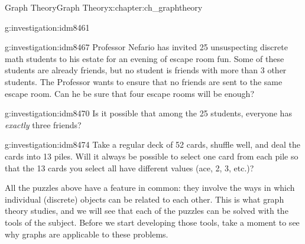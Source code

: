 \documentclass[oneside,10pt,]{book}
\numberwithin{equation}{chapter}
\begin{document}
\begin{chapterptx}{Graph Theory}{}{Graph Theory}{}{}{x:chapter:ch_graphtheory}
\begin{introduction}{}
\begin{investigation}{}{g:investigation:idm8461}
\begin{sidebyside}{1}{0}{0}{0}
\begin{sbspanel}{1}
{
}%
\end{sbspanel}%
\end{sidebyside}%
\end{investigation}
\begin{investigation}{}{g:investigation:idm8467}%
Professor Nefario has invited 25 unsuspecting discrete math students to his estate for an evening of escape room fun.  Some of these students are already friends, but no student is friends with more than 3 other students.  The Professor wants to ensure that no friends are sent to the same escape room.  Can he be sure that four escape rooms will be enough?%
\end{investigation}
\begin{investigation}{}{g:investigation:idm8470}%
Is it possible that among the 25 students, everyone has \emph{exactly} three friends?%
\end{investigation}
\begin{investigation}{}{g:investigation:idm8474}%
Take a regular deck of 52 cards, shuffle well, and deal the cards into 13 piles.  Will it always be possible to select one card from each pile so that the 13 cards you select all have different values (ace, 2, 3, etc.)?%
\end{investigation}
All the puzzles above have a feature in common: they involve the ways in which individual (discrete) objects can be related to each other.  This is what graph theory studies, and we will see that each of the puzzles can be solved with the tools of the subject.  Before we start developing those tools, take a moment to see why graphs are applicable to these problems.%

\end{introduction}
\end{chapterptx}
\end{document}
